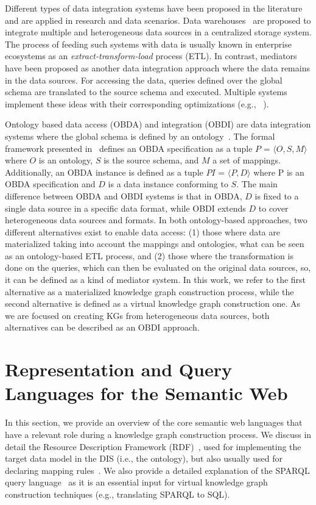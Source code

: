 Different types of data integration systems have been proposed in the literature and are applied in research and data scenarios. Data warehouses~\citep{vassiliadis2009survey} are proposed to integrate multiple and heterogeneous data sources in a centralized storage system. The process of feeding such systems with data is usually known in enterprise ecosystems as an \textit{extract-transform-load} process (ETL). In contrast, mediators~\citep{wiederhold1992mediators} have been proposed as another data integration approach where the data remains in the data sources. For accessing the data, queries defined over the global schema are translated to the source schema and executed. Multiple systems implement these ideas with their corresponding optimizations (e.g., ~\cite{tsimmis1994,rajaraman1996querying,roth1997don}).

Ontology based data access (OBDA) and integration (OBDI) are data integration systems where the global schema is defined by an ontology~\citep{poggi2008linking}. The formal framework presented in~\citep{xiao2018obdasurvey} defines an OBDA specification as a tuple $P$ = $\langle O,S,M\rangle$ where $O$ is an ontology, $S$ is the source schema, and $M$ a set of mappings. Additionally, an OBDA instance is defined as a tuple $PI$ = $\langle P,D\rangle$ where P is an OBDA specification and $D$ is a data instance conforming to $S$. The main difference between OBDA and OBDI systems is that in OBDA, $D$ is fixed to a single data source in a specific data format, while OBDI extends $D$ to cover heterogeneous data sources and formats. In both ontology-based approaches, two different alternatives exist to enable data access: (1) those where data are materialized taking into account the mappings and ontologies, what can be seen as an ontology-based ETL process, and (2) those where the transformation is done on the queries, which can then be evaluated on the original data sources, so, it can be defined as a kind of mediator system. In this work, we refer to the first alternative as a materialized knowledge graph construction process, while the second alternative is defined as a virtual knowledge graph construction one. As we are focused on creating KGs from heterogeneous data sources, both alternatives can be described as an OBDI approach.

\section{Representation and Query Languages for the Semantic Web}
\label{sec:soa_representation}
In this section, we provide an overview of the core semantic web languages that have a relevant role during a knowledge graph construction process. We discuss in detail the Resource Description Framework (RDF)~\citep{RDF}, used for implementing the target data model in the DIS (i.e., the ontology), but also usually used for declaring mapping rules~\citep{R2RML,dimou2014rml,michel2015translation}. We also provide a detailed explanation of the SPARQL query language~\citep{SPARQL} as it is an essential input for virtual knowledge graph construction techniques (e.g., translating SPARQL to SQL).

